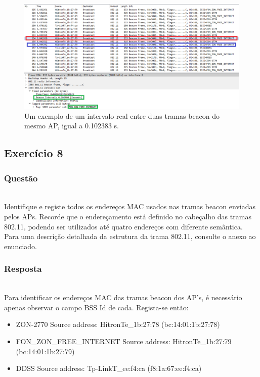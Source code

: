 \documentclass{llncs}
\begin{document}
\begin{figure}
  \begin{center}
  \includegraphics[scale=0.35]{imagens/FONZON_BI.png} 
  \end{center}
  \caption{Um exemplo de um intervalo real entre duas tramas beacon do mesmo AP, igual a 0.102383 s.}
  \label{fig:fonzon_interval}
\end{figure}


\clearpage
\subsection{Exercício 8}
\subsubsection{Questão}\rule[-10pt]{0pt}{10pt}\\

Identifique e registe todos os endereços MAC usados nas tramas beacon enviadas pelos APs. Recorde que o endereçamento está definido no cabeçalho das tramas 802.11, podendo ser utilizados até quatro endereços com diferente semântica. Para uma descrição detalhada da estrutura da trama 802.11, consulte o anexo ao enunciado.

\subsubsection{Resposta}\rule[-10pt]{0pt}{10pt}\\

Para identificar os endereços MAC das tramas beacon dos AP's, é necessário apenas observar o campo BSS Id de cada. Regista-se então:
\begin{itemize}
  \item ZON-2770 Source address: HitronTe_1b:27:78 (bc:14:01:1b:27:78)
  \item FON_ZON_FREE_INTERNET Source address: HitronTe_1b:27:79 (bc:14:01:1b:27:79)
  \item DDSS Source address: Tp-LinkT_ee:f4:ca (f8:1a:67:ee:f4:ca)
\end{itemize}
\end{document}

